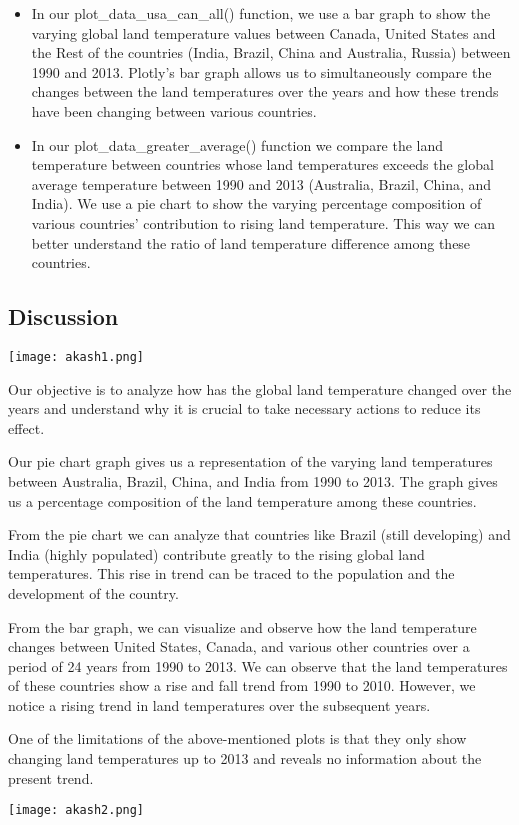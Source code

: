 \documentclass[a4paper, 11pt]{report}
\begin{document}
\begin{itemize}
    \item In our plot\_data\_usa\_can\_all() function, we use a bar graph to show the varying global land temperature values between Canada, United States and the Rest of the countries (India, Brazil, China and Australia, Russia) between 1990 and 2013. Plotly’s bar graph allows us to simultaneously compare the changes between the land temperatures over the years and how these trends have been changing between various countries.

    \item In our plot\_data\_greater\_average() function we compare the land temperature between countries whose land temperatures exceeds the global average temperature between 1990 and 2013 (Australia, Brazil, China, and India). We use a pie chart to show the varying percentage composition of various countries’ contribution to rising land temperature. This way we can better understand the ratio of land temperature difference among these countries.

\end{itemize}

\subsection{Discussion}

\begin{multicols}{2}
\texttt{[image: akash1.png]}

Our objective is to analyze how has the global land temperature changed over the years and understand why it is crucial to take necessary actions to reduce its effect.

Our pie chart graph gives us a representation of the varying land temperatures between  Australia, Brazil, China, and India from 1990 to 2013. The graph gives us a percentage composition of the land temperature among these countries.


\end{multicols}

From the pie chart we can analyze that countries like Brazil (still developing) and India (highly populated) contribute greatly to the rising global land temperatures. This rise in trend can be traced to the population and the development of the country.

	\begin{multicols}{2}
	From the bar graph, we can visualize and observe how the land temperature changes between United States, Canada, and various other countries over a period of 24 years from 1990 to 2013. We can observe that the land temperatures of these countries show a rise and fall trend from 1990 to 2010. However, we notice a rising trend in land temperatures over the subsequent years.

	One of the limitations of the above-mentioned plots is that they only show changing land temperatures up to 2013 and reveals no information about the present trend.

	\texttt{[image: akash2.png]}
	\end{multicols}
\end{document}
